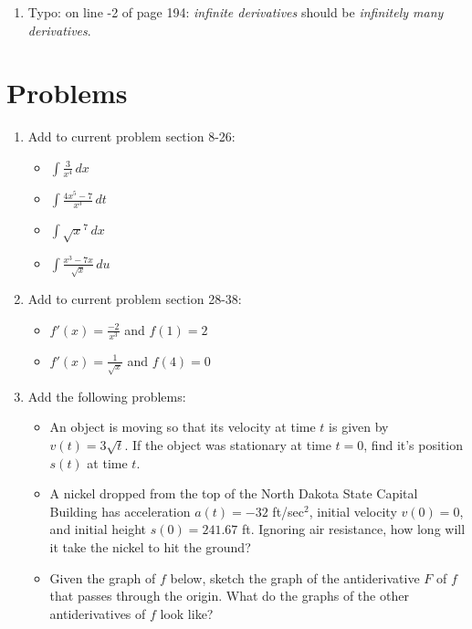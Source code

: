 \documentclass[11pt]{report}
\newcommand{\typo}[4]{\item Typo: on line #2 of page #1: \emph{#3} should be \emph{#4}.}
\begin{document}
\begin{enumerate}
\typo{194}{-2}{infinite derivatives}{infinitely many derivatives}
\end{enumerate}

\section*{Problems}

\begin{enumerate}
\item Add to current problem section 8-26:
\begin{itemize}
\item $\displaystyle\int \frac{3}{x^4}\,dx$

\item $\displaystyle\int \frac{4x^5-7}{x^3}\,dt$

\item $\displaystyle\int \sqrt x^7\,dx$

\item $\displaystyle\int \frac{x^3-7x}{\sqrt x}\,du$
\end{itemize}

\item Add to current problem section 28-38:

\begin{itemize}
\item $\displaystyle f'(x)=\frac{-2}{x^3}$ and $f(1)=2$

\item $\displaystyle f'(x)=\frac{1}{\sqrt x}$ and $f(4)=0$
\end{itemize}

\item Add the following problems:

\begin{itemize}
\item An object is moving so that its velocity at time $t$ is given by $v(t)=3\sqrt t$. If the object was stationary at time $t=0$, find it's position $s(t)$ at time $t$.

\item A nickel dropped from the top of the North Dakota State Capital Building has acceleration $a(t)=-32$ ft/sec$^2$, initial velocity $v(0)=0$, and initial height $s(0)=241.67$ ft. Ignoring air resistance, how long will it take the nickel to hit the ground?

\item Given the graph of $f$ below, sketch the graph of the antiderivative $F$ of $f$ that passes through the origin. What do the graphs of the other antiderivatives of $f$ look like? %
\end{itemize}


\end{enumerate}
\end{document}
